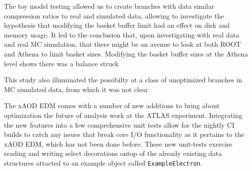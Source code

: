 The toy model testing allowed us to create branches with data similar compression ratios to real and simulated data, allowing to investigate the hypothesis that modifying the basket buffer limit had an effect on disk and memory usage.
It led to the conclusion that, upon investigating with real data and real MC simulation, that there might be an avenue to look at both ROOT and Athena to limit basket sizes. 
Modifying the basket buffer sizes at the Athena level shows there was a balance struck 

This study also illuminated the possibilty at a class of unoptimized branches in MC simulated data, from which it was not clear 

The xAOD EDM comes with a number of new additions to bring about optimization the future of analysis work at the ATLAS experiment.
Integrating the new features into a few comprehensive unit tests allow for the nightly CI builds to catch any issues that break core I/O functionality as it pertains to the xAOD EDM, which has not been done before.
These new unit-tests exercise reading and writing select decorations ontop of the already existing data structures attacted to an example object called \verb|ExampleElectron|.  